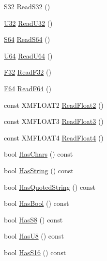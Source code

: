 \begin{DoxyCompactItemize}
\hyperlink{namespacemage_a642e05c5c83642b6946703615cdbf2da}{S32} \hyperlink{classmage_1_1_line_reader_ad3218e41f29c2c3979d1be439835c72d}{Read\+S32} ()
\item 
\hyperlink{namespacemage_a41c104c036fba3756a74e19f793eeaa1}{U32} \hyperlink{classmage_1_1_line_reader_a16e9bd6846cc8e90182582e67c41af4f}{Read\+U32} ()
\item 
\hyperlink{namespacemage_a38d4d411c173c8978eb356d2412b32dd}{S64} \hyperlink{classmage_1_1_line_reader_a8eec39fc74b8708033aa2b937bf4b785}{Read\+S64} ()
\item 
\hyperlink{namespacemage_a6672cf3c861707ce4a3235a3eb43941d}{U64} \hyperlink{classmage_1_1_line_reader_aa8866c69c282910527a2453ac80bf00f}{Read\+U64} ()
\item 
\hyperlink{namespacemage_aa97e833b45f06d60a0a9c4fc22ae02c0}{F32} \hyperlink{classmage_1_1_line_reader_af2cb067c0a9470fe0dfbfb84751101ef}{Read\+F32} ()
\item 
\hyperlink{namespacemage_ad26233bbec640deda836e572c1a23708}{F64} \hyperlink{classmage_1_1_line_reader_a8f1ae6467f871394fb62f2e5da3df3b9}{Read\+F64} ()
\item 
const X\+M\+F\+L\+O\+A\+T2 \hyperlink{classmage_1_1_line_reader_ae33effd33fad465616e3acf8acdc408f}{Read\+Float2} ()
\item 
const X\+M\+F\+L\+O\+A\+T3 \hyperlink{classmage_1_1_line_reader_a7a605a7c2402051f1ca4fda1e543fc28}{Read\+Float3} ()
\item 
const X\+M\+F\+L\+O\+A\+T4 \hyperlink{classmage_1_1_line_reader_aaa21896aa756c3402cfeb207ef5f2029}{Read\+Float4} ()
\item 
bool \hyperlink{classmage_1_1_line_reader_a7eb54d60902d1fb7846ea5c566312a0f}{Has\+Chars} () const
\item 
bool \hyperlink{classmage_1_1_line_reader_a011b5a0d1bd2d157033e3bf7d7323aed}{Has\+String} () const
\item 
bool \hyperlink{classmage_1_1_line_reader_ac92de9a3d986c7031c902c9489cfaa5a}{Has\+Quoted\+String} () const
\item 
bool \hyperlink{classmage_1_1_line_reader_ac18069cc6bc399ce6ad8ad069a073c6c}{Has\+Bool} () const
\item 
bool \hyperlink{classmage_1_1_line_reader_a462fbc4ef67b7f84940a51075c85e4b9}{Has\+S8} () const
\item 
bool \hyperlink{classmage_1_1_line_reader_a2366e6732f404890a54573fd009530aa}{Has\+U8} () const
\item 
bool \hyperlink{classmage_1_1_line_reader_af95711df4713d54f590c230e609b98aa}{Has\+S16} () const

\end{DoxyCompactItemize}
